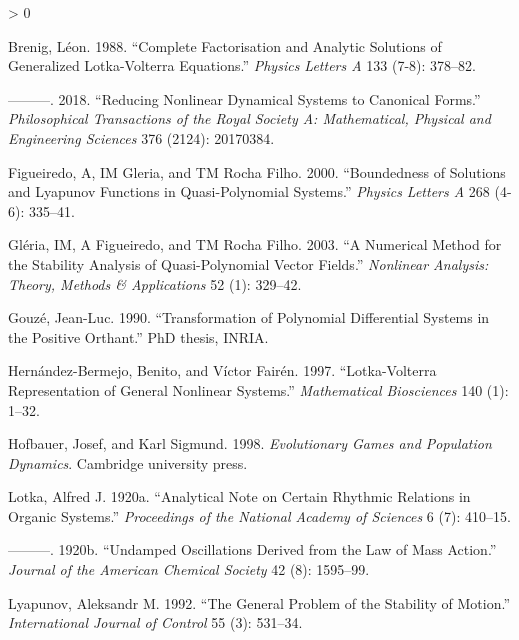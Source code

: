\documentclass{article}
\newlength{\cslhangindent}
\newenvironment{CSLReferences}[2] %
 {%
  \setlength{\parindent}{0pt}
  \ifodd #1 \everypar{\setlength{\hangindent}{\cslhangindent}}\ignorespaces\fi
  \ifnum #2 > 0
  \setlength{\parskip}{#2\baselineskip}
  \fi
 }%
 {}
\begin{document}
\hypertarget{refs}{}
\begin{CSLReferences}{1}{0}
\leavevmode\hypertarget{ref-brenig1988complete}{}%
Brenig, Léon. 1988. {``Complete Factorisation and Analytic Solutions of
Generalized Lotka-Volterra Equations.''} \emph{Physics Letters A} 133
(7-8): 378--82.

\leavevmode\hypertarget{ref-brenig2018reducing}{}%
---------. 2018. {``Reducing Nonlinear Dynamical Systems to Canonical
Forms.''} \emph{Philosophical Transactions of the Royal Society A:
Mathematical, Physical and Engineering Sciences} 376 (2124): 20170384.

\leavevmode\hypertarget{ref-figueiredo2000boundedness}{}%
Figueiredo, A, IM Gleria, and TM Rocha Filho. 2000. {``Boundedness of
Solutions and Lyapunov Functions in Quasi-Polynomial Systems.''}
\emph{Physics Letters A} 268 (4-6): 335--41.

\leavevmode\hypertarget{ref-gleria2003numerical}{}%
Gléria, IM, A Figueiredo, and TM Rocha Filho. 2003. {``A Numerical
Method for the Stability Analysis of Quasi-Polynomial Vector Fields.''}
\emph{Nonlinear Analysis: Theory, Methods \& Applications} 52 (1):
329--42.

\leavevmode\hypertarget{ref-gouze1990transformation}{}%
Gouzé, Jean-Luc. 1990. {``Transformation of Polynomial Differential
Systems in the Positive Orthant.''} PhD thesis, INRIA.

\leavevmode\hypertarget{ref-hernandez1997lotka}{}%
Hernández-Bermejo, Benito, and Víctor Fairén. 1997. {``Lotka-Volterra
Representation of General Nonlinear Systems.''} \emph{Mathematical
Biosciences} 140 (1): 1--32.

\leavevmode\hypertarget{ref-hofbauer1998evolutionary}{}%
Hofbauer, Josef, and Karl Sigmund. 1998. \emph{Evolutionary Games and
Population Dynamics}. Cambridge university press.

\leavevmode\hypertarget{ref-lotka1920analytical}{}%
Lotka, Alfred J. 1920a. {``Analytical Note on Certain Rhythmic Relations
in Organic Systems.''} \emph{Proceedings of the National Academy of
Sciences} 6 (7): 410--15.

\leavevmode\hypertarget{ref-lotka1920undamped}{}%
---------. 1920b. {``Undamped Oscillations Derived from the Law of Mass
Action.''} \emph{Journal of the American Chemical Society} 42 (8):
1595--99.

\leavevmode\hypertarget{ref-lyapunov1992general}{}%
Lyapunov, Aleksandr M. 1992. {``The General Problem of the Stability of
Motion.''} \emph{International Journal of Control} 55 (3): 531--34.


\end{CSLReferences}
\end{document}
